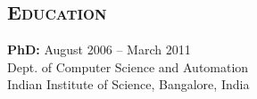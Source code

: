 \documentclass[margin,10pt]{res} %
\begin{document}
\begin{resume}

\section{\textnormal{\textsc{Education}}}
\textbf{PhD:} \hfill August 2006 -- March 2011\\
Dept. of Computer Science and Automation\\
Indian Institute of Science, Bangalore, India\\ 


\end{resume}
\end{document}
